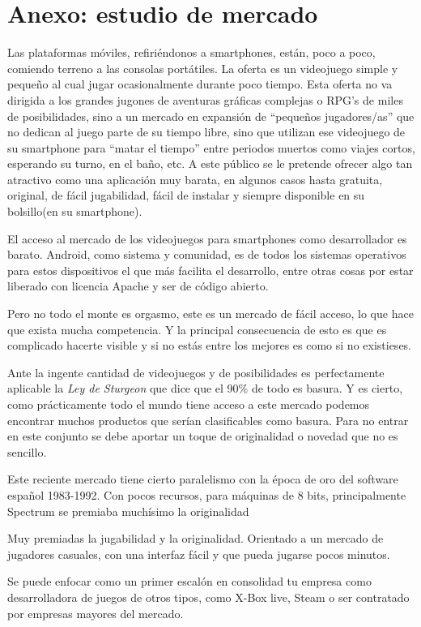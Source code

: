 \documentclass[12 pt, a4paper, twoside]{article}
\begin{document}
\section{Anexo: estudio de mercado}
Las plataformas móviles, refiriéndonos a smartphones, están, poco a
poco, comiendo terreno a las consolas portátiles. La oferta es un
videojuego simple y pequeño al cual jugar ocasionalmente durante
poco tiempo. Esta oferta no va dirigida a los grandes jugones de
aventuras gráficas complejas o RPG's de miles de posibilidades, sino a un
mercado en expansión de ``pequeños jugadores/as'' que no dedican al
juego parte de su tiempo libre, sino que utilizan ese videojuego de su
smartphone  para ``matar el tiempo'' entre periodos muertos como
viajes cortos, esperando su turno, en el baño, etc. A este público se
le pretende ofrecer algo tan atractivo como una aplicación muy barata, en
algunos casos hasta gratuita, original, de fácil jugabilidad, fácil de
instalar y siempre disponible en su bolsillo(en su smartphone).

El acceso al mercado de los videojuegos para smartphones como
desarrollador es barato. Android, como sistema y comunidad, es de
todos los sistemas operativos para estos dispositivos el que más
facilita el desarrollo, entre otras cosas por estar liberado con
licencia Apache y ser de código abierto.

Pero no todo el monte es orgasmo, este es un mercado de fácil acceso,
lo que hace que exista mucha competencia. Y la principal consecuencia
de esto es que es complicado hacerte visible y si no estás entre los
mejores es como si no existieses.

Ante la ingente cantidad de videojuegos y de posibilidades es
perfectamente aplicable la \emph{Ley de Sturgeon} que dice que el 90\%
de todo es basura. Y es cierto, como prácticamente todo el mundo tiene
acceso a este mercado podemos encontrar muchos productos que serían
clasificables como basura. Para no entrar en este conjunto se debe
aportar un toque de originalidad o novedad que no es sencillo.

Este reciente mercado tiene cierto paralelismo con la época de oro del
software español 1983-1992. Con pocos recursos, para máquinas de 8
bits, principalmente Spectrum se premiaba muchísimo la originalidad


Muy premiadas la jugabilidad y la originalidad. Orientado a un mercado
de jugadores casuales, con una interfaz fácil y que pueda jugarse
pocos minutos.

Se puede enfocar como un primer escalón en consolidad tu empresa como
desarrolladora de juegos de otros tipos, como X-Box live, Steam o ser
contratado por empresas mayores del mercado.
\end{document}
